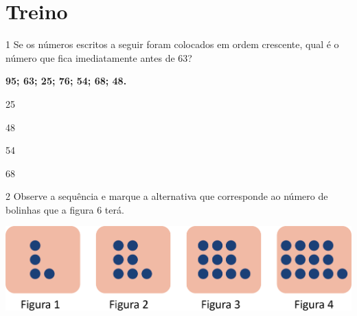 \pagebreak

\section*{Treino}

\num{1} Se os números escritos a seguir foram colocados em ordem crescente, qual
é o número que fica imediatamente antes de 63?

\begin{myquote}
\centering
\textbf{95; 63; 25; 76; 54; 68; 48.}
\end{myquote}

\begin{escolha}
\begin{multicols}{2}
\item 25

\item 48
\end{multicols}


\begin{multicols}{2}
\item 54

\item 68
\end{multicols}
\end{escolha}

\num{2} Observe a sequência e marque a alternativa que corresponde ao número de bolinhas que a figura 6 terá.

\vspace{1em}


\begin{center}
\includegraphics[width=.7\textwidth]{./media/image32.png}
\end{center}

